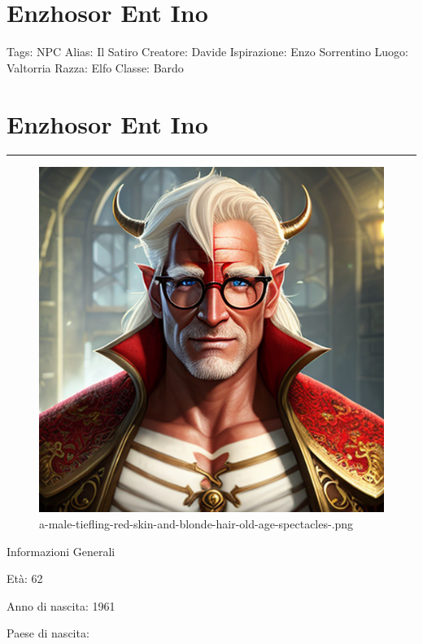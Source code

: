 \section{Enzhosor Ent Ino}\label{enzhosor-ent-ino}

Tags: NPC Alias: Il Satiro Creatore: Davide Ispirazione: Enzo Sorrentino
Luogo: Valtorria Razza: Elfo Classe: Bardo

\section{Enzhosor Ent Ino}\label{enzhosor-ent-ino-1}

\begin{center}\rule{0.5\linewidth}{0.5pt}\end{center}

\begin{figure}
\centering
\includegraphics{a-male-tiefling-red-skin-and-blonde-hair-old-age-spectacles-.png}
\caption{a-male-tiefling-red-skin-and-blonde-hair-old-age-spectacles-.png}
\end{figure}

Informazioni Generali

Età: 62

Anno di nascita: 1961

Paese di nascita:

